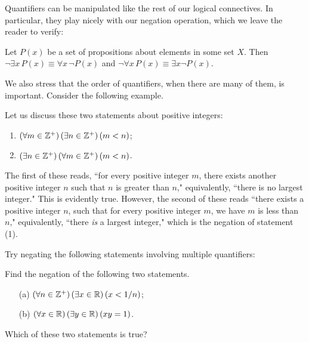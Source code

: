 \documentclass{article}
\begin{document}
Quantifiers can be manipulated like the rest of our logical connectives. In particular, they play nicely with our negation operation, which we leave the reader to verify:
\begin{proposition}
Let $P(x)$ be a set of propositions about elements in some set $X$. Then $\lnot \exists x\, P(x) \equiv \forall x\, \lnot P(x)$ and $\lnot \forall x\, P(x) \equiv \exists x\lnot P(x)$.
\end{proposition}
We also stress that the order of quantifiers, when there are many of them, is important. Consider the following example.
\begin{example}
Let us discuss these two statements about positive integers:
\begin{enumerate}
    \item $(\forall m\in \mathbb Z^+)\, (\exists n\in\mathbb Z^+) \, (m < n)$;
    \item $(\exists n\in\mathbb Z^+)\, (\forall m\in\mathbb Z^+)\, (m < n)$.
\end{enumerate}
The first of these reads, ``for every positive integer $m$, there exists another positive integer $n$ such that $n$ is greater than $n$," equivalently, ``there is no largest integer." This is evidently true. However, the second of these reads ``there exists a positive integer $n$, such that for every positive integer $m$, we have $m$ is less than $n$," equivalently, ``there \textit{is} a largest integer," which is the negation of statement (1).
\end{example}
Try negating the following statements involving multiple quantifiers:
\begin{exercise}
Find the negation of the following two statements.
\begin{itemize}
    \item[(a)] $(\forall n\in\mathbb Z^+)\, (\exists x \in \mathbb R)\, (x< 1/n)$;
    \item[(b)] $(\forall x\in\mathbb R)\, (\exists y\in \mathbb R)\, (xy = 1)$.
\end{itemize}
Which of these two statements is true?
\end{exercise}
\end{document}
